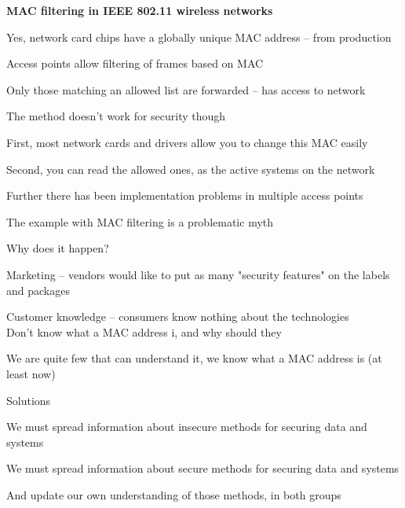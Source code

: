 \documentclass[Screen16to9,17pt]{foils}
\begin{document}


{\bf MAC filtering in IEEE 802.11 wireless networks}
\begin{list2}
\item Yes, network card chips have a globally unique MAC address -- from production
\item Access points allow filtering of frames based on MAC
\item Only those matching an allowed list are forwarded -- has access to network
\item The method doesn't work for security though \smiley
\item First, most network cards and drivers allow you to change this MAC easily
\item Second, you can read the allowed ones, as the active systems on the network
\item Further there has been implementation problems in multiple access points
\end{list2}


The example with MAC filtering is a problematic myth

Why does it happen?
\begin{list2}
\item Marketing -- vendors would like to put as many "security features" on the labels and packages
\item Customer knowledge -- consumers know nothing about the technologies\\
Don't know what a MAC address i, and why should they
\item We are quite few that can understand it, we know what a MAC address is (at least now)
\end{list2}

Solutions
\begin{list2}
\item We must spread information about insecure methods for securing data and systems
\item We must spread information about secure methods for securing data and systems
\item And update our own understanding of those methods, in both groups
\end{list2}


\end{document}

